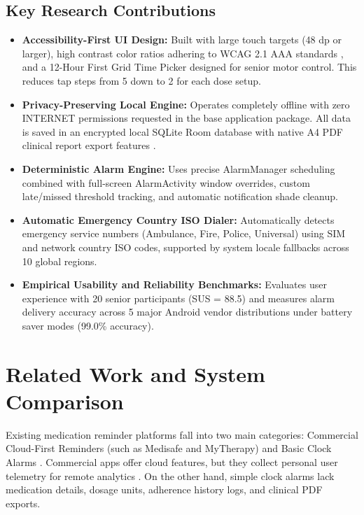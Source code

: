 \documentclass[10pt]{article}
\begin{document}
\subsection{Key Research Contributions}
\begin{itemize}
    \item \textbf{Accessibility-First UI Design:} Built with large touch targets (48 dp or larger), high contrast color ratios adhering to WCAG 2.1 AAA standards \cite{w3c2018wcag}, and a 12-Hour First Grid Time Picker designed for senior motor control. This reduces tap steps from 5 down to 2 for each dose setup.
    \item \textbf{Privacy-Preserving Local Engine:} Operates completely offline with zero INTERNET permissions requested in the base application package. All data is saved in an encrypted local SQLite Room database with native A4 PDF clinical report export features \cite{aosp2024offline}.
    \item \textbf{Deterministic Alarm Engine:} Uses precise AlarmManager scheduling combined with full-screen AlarmActivity window overrides, custom late/missed threshold tracking, and automatic notification shade cleanup.
    \item \textbf{Automatic Emergency Country ISO Dialer:} Automatically detects emergency service numbers (Ambulance, Fire, Police, Universal) using SIM and network country ISO codes, supported by system locale fallbacks across 10 global regions.
    \item \textbf{Empirical Usability and Reliability Benchmarks:} Evaluates user experience with 20 senior participants (SUS = 88.5) \cite{brooke1996sus} and measures alarm delivery accuracy across 5 major Android vendor distributions under battery saver modes (99.0\% accuracy).
\end{itemize}

\section{Related Work and System Comparison}

Existing medication reminder platforms fall into two main categories: Commercial Cloud-First Reminders (such as Medisafe and MyTherapy) and Basic Clock Alarms \cite{haynes2002helping}. Commercial apps offer cloud features, but they collect personal user telemetry for remote analytics \cite{aosp2024offline}. On the other hand, simple clock alarms lack medication details, dosage units, adherence history logs, and clinical PDF exports.
\end{document}
